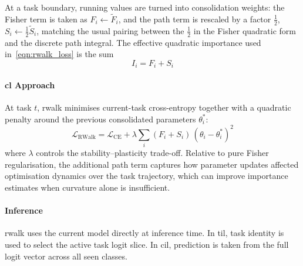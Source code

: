 At a task boundary, running values are turned into consolidation weights: the Fisher term is taken as $F_i\leftarrow \tilde F_i$, and the path term is rescaled by a factor $\tfrac{1}{2}$, $S_i\leftarrow \tfrac{1}{2}\tilde S_i$, matching the usual pairing between the $\tfrac{1}{2}$ in the Fisher quadratic form and the discrete path integral. The effective quadratic importance used in~\eqref{eqn:rwalk_loss} is the sum
%
\begin{equation}\label{eqn:rwalk_importance}
    I_i = F_i + S_i
\end{equation}

\paragraph{\gls{cl} Approach}

At task $t$, \gls{rwalk} minimises current-task cross-entropy together with a quadratic penalty around the previous consolidated parameters $\theta_i^*$:
%
\begin{equation}\label{eqn:rwalk_loss}
    \mathcal{L}_\text{RWalk}
    =
    \mathcal{L}_\text{CE}
    +
    \lambda
    \sum_i (F_i + S_i)\,(\theta_i-\theta_i^*)^2
\end{equation}
%
where $\lambda$ controls the stability--plasticity trade-off. Relative to pure Fisher regularisation, the additional path term captures how parameter updates affected optimisation dynamics over the task trajectory, which can improve importance estimates when curvature alone is insufficient.

\paragraph{Inference}

\gls{rwalk} uses the current model directly at inference time. In \gls{til}, task identity is used to select the active task logit slice. In \gls{cil}, prediction is taken from the full logit vector across all seen classes.
